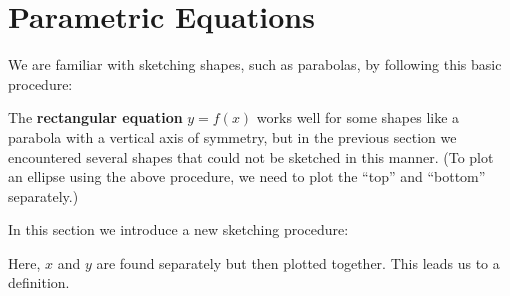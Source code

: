 \section{Parametric Equations}\label{sec:param_eqs}

We are familiar with sketching  shapes, such as parabolas, by following this basic procedure:

\begin{center}
\end{center}

The \textbf{rectangular equation} $y=f(x)$ works well for some shapes like a parabola with a vertical axis of symmetry, but in the previous section we encountered several shapes that could not be sketched in this manner. (To plot an ellipse using the above procedure, we need to plot the ``top'' and ``bottom'' separately.)

In this section we introduce a new sketching procedure:

\begin{center}
\end{center}

Here, $x$ and $y$ are found separately but then plotted together. This leads us to a definition.


